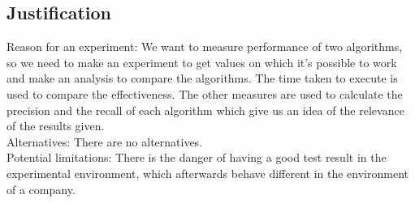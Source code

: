 \documentclass{article}
\begin{document}
\subsection{Justification}
Reason for an experiment: We want to measure performance of two algorithms, so we need to make an experiment to get values on which it’s possible to work and make an analysis to compare the algorithms.
The time taken to execute is used to compare the effectiveness.
The other measures are used to calculate the precision and the recall of each algorithm which give us an idea of the relevance of the results given. \\
Alternatives: There are no alternatives. \\
Potential limitations: There is the danger of having a good test result in the experimental environment, which afterwards behave different in the environment of a company.
\end{document}
